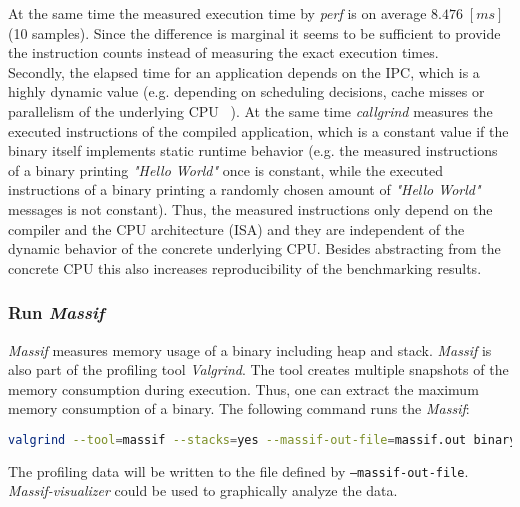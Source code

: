 At the same time the measured execution time by \textit{perf} is on average $8.476\;[ms]$ (10 samples). Since the difference is marginal it seems to be sufficient to provide the instruction counts instead of measuring the exact execution times.
\\
Secondly, the elapsed time for an application depends on the \gls{IPC}, which is a highly dynamic value (e.g. depending on scheduling decisions, cache misses or parallelism of the underlying \gls{CPU} ~\parencite{alameldeen2006ipc}). At the same time \textit{callgrind} measures the executed instructions of the compiled application, which is a constant value if the binary itself implements static runtime behavior (e.g. the measured instructions of a binary printing \textit{"Hello World"} once is constant, while the executed instructions of a binary printing a randomly chosen amount of \textit{"Hello World"} messages is not constant). Thus, the measured instructions only depend on the compiler and the \gls{CPU} architecture (\gls{ISA}) and they are independent of the dynamic behavior of the concrete underlying \gls{CPU}. Besides abstracting from the concrete \gls{CPU} this also increases reproducibility of the benchmarking results.

\subsubsection{Run \textit{Massif}}
\textit{Massif} measures memory usage of a binary including heap and stack. \textit{Massif} is also part of the profiling tool \textit{Valgrind}. The tool creates multiple snapshots of the memory consumption during execution. Thus, one can extract the maximum memory consumption of a binary. The following command runs the \textit{Massif}:
\begin{lstlisting}[language=Bash]
valgrind --tool=massif --stacks=yes --massif-out-file=massif.out binary
\end{lstlisting}
The profiling data will be written to the file defined by \texttt{--massif-out-file}. \textit{Massif-visualizer} could be used to graphically analyze the data.

